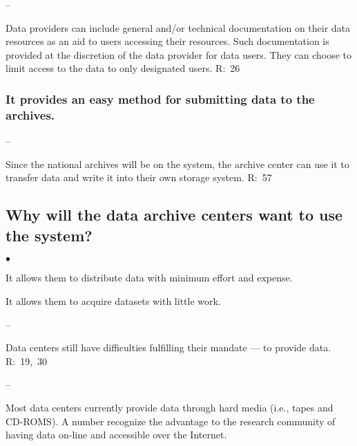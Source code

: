\begin{list}{}{}
\begin{list}{--}{}
\end{list}

\item Data providers can include general and/or technical documentation on
their data resources as an aid to users accessing their resources.
Such documentation is provided at the discretion of the data provider
for data users.  They can choose to limit access to the data
to only designated users.
       R:~26


\subsubsection {It provides an easy method for submitting data to the 
archives.}

\begin{list}{--}{}

\item Since the national archives will be on the system, the archive
       center can use it to transfer data and write it into their
       own storage system. 
       R:~57

\end{list}

\subsection {Why will the data archive centers want to use the system?}

\begin{list}{$\bullet$}{}

\item It allows them to distribute data with minimum effort and expense.

\item It allows them to acquire datasets with little work.

\end{list}

\begin{list}{--}{}

\item Data centers still have difficulties fulfilling their mandate ---
        to provide data. 
        R:~19,~30

\begin{list}{--}{}

     \item Most data centers currently provide data through hard media
           (i.e., tapes and CD-ROMS).  A number recognize the
           advantage to the research community of having data on-line
           and accessible over the Internet.


\end{list}
\end{list}
\end{list}
